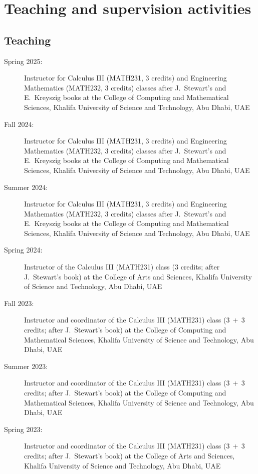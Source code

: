 \section{Teaching and supervision activities}

    \subsection{Teaching}
    \begin{description}
        \item[Spring 2025:] Instructor for Calculus III (MATH231, $3$ credits) and Engineering Mathematics (MATH232, $3$ credits) classes after J.~Stewart's and E.~Kreyszig books at the College of Computing and Mathematical Sciences, Khalifa University of Science and Technology, Abu Dhabi, UAE
        \item[Fall 2024:] Instructor for Calculus III (MATH231, $3$ credits) and Engineering Mathematics (MATH232, $3$ credits) classes after J.~Stewart's and E.~Kreyszig books at the College of Computing and Mathematical Sciences, Khalifa University of Science and Technology, Abu Dhabi, UAE
        \item[Summer 2024:] Instructor for Calculus III (MATH231, $3$ credits) and Engineering Mathematics (MATH232, $3$ credits) classes after J.~Stewart's and E.~Kreyszig books at the College of Computing and Mathematical Sciences, Khalifa University of Science and Technology, Abu Dhabi, UAE
        \item[Spring 2024:] Instructor of the Calculus III (MATH231) class ($3$ credits; after J.~Stewart's book) at the College of Arts and Sciences, Khalifa University of Science and Technology, Abu Dhabi, UAE
        \item[Fall 2023:] Instructor and coordinator of the Calculus III (MATH231) class ($3\ +\ 3$ credits; after J.~Stewart's book) at the College of Computing and Mathematical Sciences, Khalifa University of Science and Technology, Abu Dhabi, UAE
        \item[Summer 2023:] Instructor and coordinator of the Calculus III (MATH231) class ($3\ +\ 3$ credits; after J.~Stewart's book) at the College of Computing and Mathematical Sciences, Khalifa University of Science and Technology, Abu Dhabi, UAE
        \item[Spring 2023:] Instructor and coordinator of the Calculus III (MATH231) class ($3\ +\ 3$ credits; after J.~Stewart's book) at the College of Arts and Sciences, Khalifa University of Science and Technology, Abu Dhabi, UAE

\end{description}
